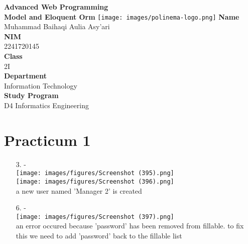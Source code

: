 \documentclass[12pt,titlepage]{article}
\newcommand{\vSubject}{Advanced Web Programming}
\newcommand{\vSubtitle}{Model and Eloquent Orm}
\newcommand{\vName}{Muhammad Baihaqi Aulia Asy'ari}
\newcommand{\vNIM}{2241720145}
\newcommand{\vClass}{2I}
\newcommand{\vDepartment}{Information Technology}
\newcommand{\vStudyProgram}{D4 Informatics Engineering}
\begin{document}
\begin{titlepage}
    \centering
    \vfill
    {\bfseries\LARGE
        \vSubject\\
        \vskip0.25cm
        \vSubtitle
    }
    \vfill
    \texttt{[image: images/polinema-logo.png]}
    \vfill
    {
        \textbf{Name}\\
        \vName\\
        \vskip0.5cm
        \textbf{NIM}\\
        \vNIM\\
        \vskip0.5cm
        \textbf{Class}\\
        \vClass\\
        \vskip0.5cm
        \textbf{Department}\\
        \vDepartment\\
        \vskip0.5cm
        \textbf{Study Program}\\
        \vStudyProgram
    }
\end{titlepage}

\newpage

\section{Practicum 1}
\begin{enumerate}
    \item[3.] - \\ \texttt{[image: images/figures/Screenshot (395).png]} \\ \texttt{[image: images/figures/Screenshot (396).png]} \\ a new user named 'Manager 2' is created
    \newpage
    \item[6.] -  \\ \texttt{[image: images/figures/Screenshot (397).png]} \\ an error occured because 'password' has been removed from fillable. to fix this we need to add 'password' back to the fillable list
\end{enumerate}
\end{document}
